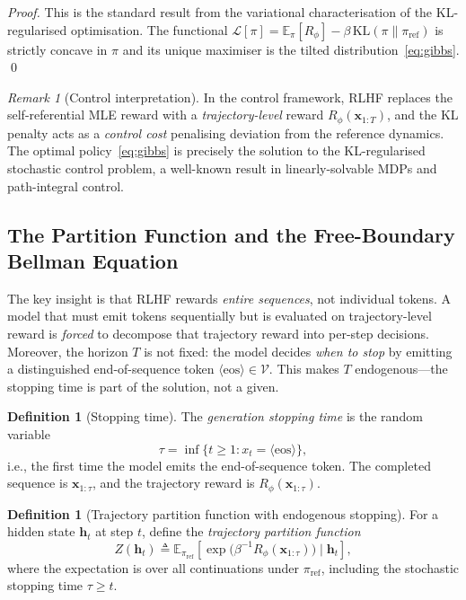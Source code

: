 \documentclass[11pt,a4paper]{article}
\theoremstyle{plain}
\theoremstyle{definition}
\newtheorem{definition}[theorem]{Definition}
\theoremstyle{remark}
\newtheorem{remark}[theorem]{Remark}
\newcommand{\E}{\mathbb{E}}
\newcommand{\cL}{\mathcal{L}}
\newcommand{\KL}{\mathrm{KL}}
\newcommand{\vocab}{\mathcal{V}}
\begin{document}
\begin{proof}
This is the standard result from the variational characterisation of the
KL-regularised optimisation. The functional
$\cL[\pi] = \E_\pi[R_\phi] - \beta\,\KL(\pi\|\pi_{\mathrm{ref}})$
is strictly concave in $\pi$ and its unique maximiser is the tilted
distribution~\eqref{eq:gibbs}. \qed
\end{proof}

\begin{remark}[Control interpretation]
In the control framework, RLHF replaces the self-referential MLE reward with a
\emph{trajectory-level} reward $R_\phi(\bm{x}_{1:T})$, and the KL penalty
acts as a \emph{control cost} penalising deviation from the reference dynamics.
The optimal policy~\eqref{eq:gibbs} is precisely the solution to the
KL-regularised stochastic control problem, a well-known result in
linearly-solvable MDPs and path-integral control.
\end{remark}

\subsection{The Partition Function and the Free-Boundary Bellman Equation}

The key insight is that RLHF rewards \emph{entire sequences}, not individual
tokens. A model that must emit tokens sequentially but is evaluated on
trajectory-level reward is \emph{forced} to decompose that trajectory reward
into per-step decisions. Moreover, the horizon $T$ is not fixed: the model
decides \emph{when to stop} by emitting a distinguished end-of-sequence token
$\langle\mathrm{eos}\rangle \in \vocab$. This makes $T$ endogenous---the
stopping time is part of the solution, not a given.

\begin{definition}[Stopping time]
The \emph{generation stopping time} is the random variable
\[
  \tau = \inf\{t \geq 1 : x_t = \langle\mathrm{eos}\rangle\},
\]
i.e., the first time the model emits the end-of-sequence token. The
completed sequence is $\bm{x}_{1:\tau}$, and the trajectory reward is
$R_\phi(\bm{x}_{1:\tau})$.
\end{definition}

\begin{definition}[Trajectory partition function with endogenous stopping]\label{def:partition}
For a hidden state $\bm{h}_t$ at step $t$, define the \emph{trajectory
partition function}
\begin{equation}\label{eq:partition}
  Z(\bm{h}_t) \triangleq
  \E_{\pi_{\mathrm{ref}}}\!\left[
    \exp\!\bigl(\beta^{-1} R_\phi(\bm{x}_{1:\tau})\bigr)
    \;\Big|\; \bm{h}_t
  \right],
\end{equation}
where the expectation is over all continuations under $\pi_{\mathrm{ref}}$,
including the stochastic stopping time $\tau \geq t$.
\end{definition}
\end{document}

